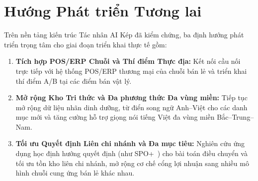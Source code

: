 \section{Hướng Phát triển Tương lai}

Trên nền tảng kiến trúc Tác nhân AI Kép đã kiểm chứng, ba định hướng phát triển trọng tâm cho giai đoạn triển khai thực tế gồm:
\begin{enumerate}
    \item \textbf{Tích hợp POS/ERP Chuỗi và Thí điểm Thực địa:} Kết nối cầu nối  trực tiếp với hệ thống POS/ERP thương mại của chuỗi bán lẻ và triển khai thí điểm A/B tại các điểm bán vật lý.
    \item \textbf{Mở rộng Kho Tri thức và Đa phương thức Đa vùng miền:} Tiếp tục mở rộng dữ liệu nhãn dinh dưỡng, từ điển song ngữ Anh--Việt cho các danh mục mới và tăng cường hỗ trợ giọng nói tiếng Việt đa vùng miền Bắc--Trung--Nam.
    \item \textbf{Tối ưu Quyết định Liên chi nhánh và Đa mục tiêu:} Nghiên cứu ứng dụng học định hướng quyết định (như SPO+~\cite{elmachtoub2022spo}) cho bài toán điều chuyển và tối ưu tồn kho liên chi nhánh, mở rộng cơ chế cổng lợi nhuận sang nhiều mô hình chuỗi cung ứng bán lẻ khác nhau.
\end{enumerate}
